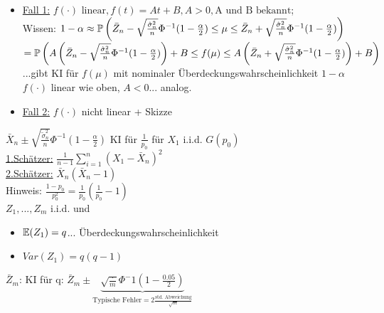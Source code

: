 \documentclass{tstextbook}
\begin{document}
\begin{example}
\begin{itemize}
	\item \underline{Fall 1:} $f(\cdot) \text{ linear}, f(t)=At+B, A>0, \text{A und B bekannt} $; \\
		Wissen: $ 1- \alpha \approx \mathbb P \left( \bar{Z}_n - \sqrt{ \frac{ \hat{\sigma}_n^2}{n}}  \Phi^{-1} (1- \frac{\alpha}{2}) \leq \mu \leq \bar{Z}_n + \sqrt{ \frac{ \hat{\sigma}_n^2}{n}}  \Phi^{-1} (1- \frac{\alpha}{2}) \right) $ \\
		$ = \mathbb P \left( A\left(\bar{Z}_n - \sqrt{ \frac{ \hat{\sigma}_n^2}{n}}  \Phi^{-1} (1- \frac{\alpha}{2})\right ) + B \leq f(\mu) \leq A\left(\bar{Z}_n + \sqrt{ \frac{ \hat{\sigma}_n^2}{n}}  \Phi^{-1} (1- \frac{\alpha}{2})\right) + B \right) $ \\
		...gibt KI für $f(\mu)$ mit nominaler Überdeckungswahrscheinlichkeit $ 1-\alpha $\\
		$f(\cdot)$ linear wie oben, $A<0$... analog.
	
	\item \underline{Fall 2:} $f(\cdot)$ nicht linear + Skizze
	
	\end{itemize}
	
	\end	{example}
	
	\newpage
	
	$ \bar{X}_n \pm \sqrt{\frac{\tilde{\sigma}_n^2}{n}} \Phi^{-1} (1- \frac{\alpha}{2})$ KI für $\frac{1}{p_0}$ für $X_1$ i.i.d. $G(p_0)$ \\

\underline{1.Schätzer:} $ \frac{1}{n-1} \sum_{i=1}^{n} (X_1 - \bar{X}_n)^2 $\\
\underline{2.Schätzer:} $ \bar{X}_n (\bar{X}_n-1) $\\

Hinweis: $\frac{1-p_0}{p_0^2}= \frac{1}{p_0}(\frac{1}{p_0}-1)$\\

$Z_1,...,Z_m $ i.i.d. und \begin{itemize}
    \item $\mathbb E(Z_1)= q $... Überdeckungswahrscheinlichkeit
    \item $Var(Z_1)=q(q-1)$
    
\end{itemize}

$\bar{Z}_m$: KI für q: $\bar{Z}_m \pm  \underbrace{\sqrt{\frac{\cdot}{m}} \Phi^-1 (1- \frac{0.05}{2})}_{ \text{Typische Fehler}= 2 \frac{\text{std. Abweichung}}{\sqrt{m}}} $
\end{document}
